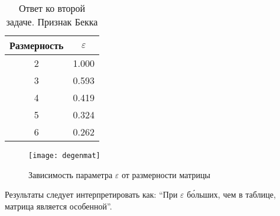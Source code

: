 \begin{table}[H]
	\begin{center}
		\begin{tabular}{|c|c|}
			\hline
			Размерность & $\varepsilon$ \\
			\hline
			2 & 1.000 \\
			\hline
			3 & 0.593 \\
			\hline
			4 & 0.419 \\
			\hline
			5 & 0.324 \\
			\hline
			6 & 0.262 \\
			\hline
		\end{tabular}
		\caption{Ответ ко второй задаче. Признак Бекка}
	\end{center}
\end{table}

\begin{figure}[H]
	\begin{center}
		\texttt{[image: degenmat]}
		\label{pic:degenmat}
		\caption{Зависимость параметра $\varepsilon$ от размерности матрицы}
	\end{center}
\end{figure}

\begin{remark}
	Результаты следует интерпретировать как: ``При $\varepsilon$ б\'{о}льших, чем в таблице, матрица является особенной''.
\end{remark}